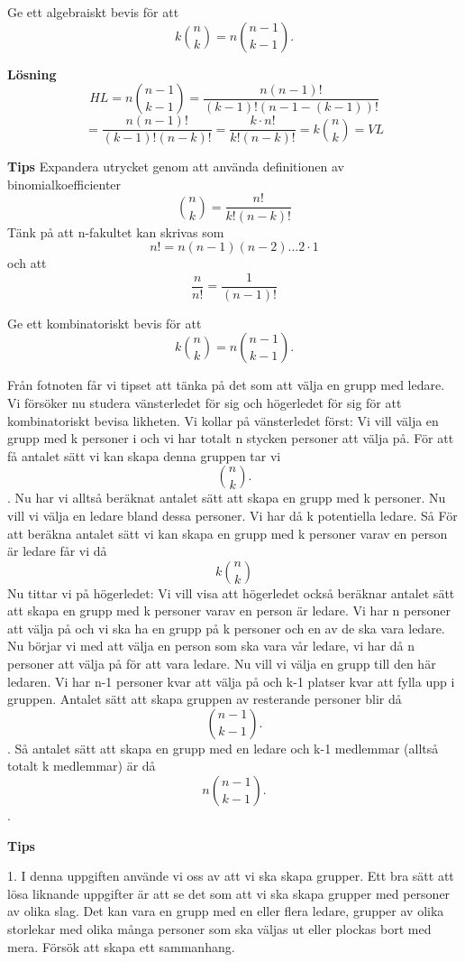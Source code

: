 \documentclass{tufte-handout}
\begin{document}
\begin{xca}
	Ge ett algebraiskt bevis för att
	$$k\binom{n}{k} = n \binom{n-1}{k-1}.$$
\end{xca}

\noindent\textbf{Lösning}
    $$HL = n \binom{n-1}{k-1} = \frac{n(n-1)!}{(k-1)!(n-1-(k-1))!}$$ $$= \frac{n(n-1)!}{(k-1)!(n-k)!} = \frac{k\cdot n!}{k!(n-k)!} = k\binom{n}{k} = VL$$
    
\noindent\textbf{Tips}
    Expandera utrycket genom att använda definitionen av binomialkoefficienter
    $$\binom{n}{k} = \frac{n!}{k!(n-k)!}$$
    Tänk på att n-fakultet kan skrivas som
    $$n! = n(n-1)(n-2)...2\cdot 1$$ 
    och att
    $$\frac{n}{n!} = \frac{1}{(n-1)!}$$

\begin{xca}
	Ge ett kombinatoriskt bevis för att
	$$k\binom{n}{k} = n \binom{n-1}{k-1}.$$

    Från fotnoten får vi tipset att tänka på det som att välja en grupp med ledare. Vi försöker nu studera vänsterledet för sig och högerledet för sig för att kombinatoriskt bevisa likheten. 
        Vi kollar på vänsterledet först: Vi vill välja en grupp med k personer i och vi har totalt n stycken personer att välja på. För att få antalet sätt vi kan skapa denna gruppen tar vi $$\binom{n}{k}.$$. Nu har vi alltså beräknat antalet sätt att skapa en grupp med k personer. Nu vill vi välja en ledare bland dessa personer. Vi har då k potentiella ledare. Så För att beräkna antalet sätt vi kan skapa en grupp med k personer varav en person är ledare får vi då $$k\binom{n}{k}$$
        Nu tittar vi på högerledet: Vi vill visa att högerledet också beräknar antalet sätt att skapa en grupp med k personer varav en person är ledare. Vi har n personer att välja på och vi ska ha en grupp på k personer och en av de ska vara ledare. Nu börjar vi med att välja en person som ska vara vår ledare, vi har då n personer att välja på för att vara ledare. Nu vill vi välja en grupp till den här ledaren. Vi har n-1 personer kvar att välja på och k-1 platser kvar att fylla upp i gruppen. Antalet sätt att skapa gruppen av resterande personer blir då $$\binom{n-1}{k-1}.$$. Så antalet sätt att skapa en grupp med en ledare och k-1 medlemmar (alltså totalt k medlemmar) är då $$n \binom{n-1}{k-1}.$$. 

\noindent\textbf{Tips}

         1. I denna uppgiften använde vi oss av att vi ska skapa grupper. Ett bra sätt att lösa liknande uppgifter är att se det som att vi ska skapa grupper med personer av olika slag. Det kan vara en grupp med en eller flera ledare, grupper av olika storlekar med olika många personer som ska väljas ut eller plockas bort med mera. Försök att skapa ett sammanhang.
         

\end{xca}
\end{document}
